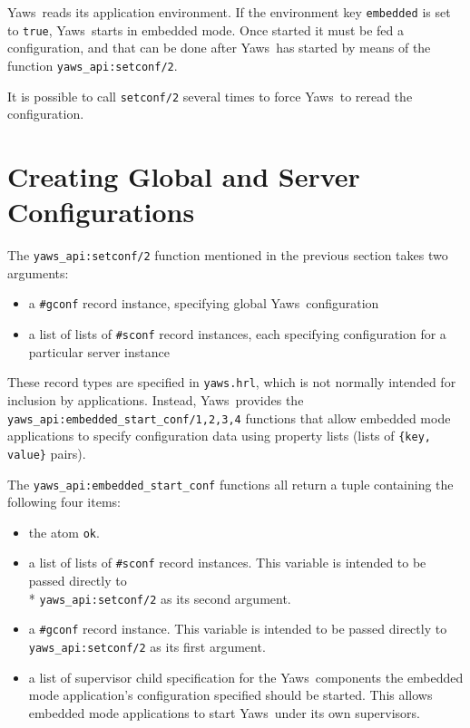 \documentclass[11pt,oneside,english]{book}
\newcommand{\Yaws}            %
        {{\sc Yaws}}
\begin{document}
\Yaws\  reads its application environment. If the environment key
\verb+embedded+ is set to \verb+true+, \Yaws\  starts in embedded mode.
Once started it must be fed a configuration, and that can be done
after \Yaws\  has started by means of the function
\verb+yaws_api:setconf/2+.

It is possible to call \verb+setconf/2+ several times to force \Yaws\  to
reread the configuration.

\section{Creating Global and Server Configurations}

The \verb+yaws_api:setconf/2+ function mentioned in the previous
section takes two arguments:

\begin{itemize}

\item a \verb+#gconf+ record instance, specifying global
  \Yaws\ configuration

\item a list of lists of \verb+#sconf+ record instances, each
  specifying configuration for a particular server instance

\end{itemize}

These record types are specified in \verb+yaws.hrl+, which is not
normally intended for inclusion by applications. Instead,
\Yaws\  provides the \verb+yaws_api:embedded_start_conf/1,2,3,4+
functions that allow embedded mode applications to specify
configuration data using property lists (lists of
\verb+{key, value}+ pairs).

The \verb+yaws_api:embedded_start_conf+ functions all return a tuple
containing the following four items:

\begin{itemize}

\item the atom \verb+ok+.

\item a list of lists of \verb+#sconf+ record instances. This variable
  is intended to be passed directly to\\* \verb+yaws_api:setconf/2+ as
  its second argument.

\item a \verb+#gconf+ record instance. This variable is intended to
  be passed directly to \verb+yaws_api:setconf/2+ as its first
  argument.

\item a list of supervisor child specification for the
  \Yaws\  components the embedded mode application's configuration
  specified should be started. This allows embedded mode applications
  to start \Yaws\  under its own supervisors.

\end{itemize}
\end{document}
